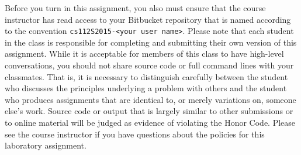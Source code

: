 Before you turn in this assignment, you also must ensure that the course instructor has read access to your Bitbucket
repository that is named according to the convention {\tt cs112S2015-<your user name>}. Please note that each student in
the class is responsible for completing and submitting their own version of this assignment. While it is acceptable for
members of this class to have high-level conversations, you should not share source code or full command lines with your
classmates.  That is, it is necessary to distinguish carefully between the student who discusses the principles
underlying a problem with others and the student who produces assignments that are identical to, or merely variations
on, someone else's work.  Source code or output that is largely similar to other submissions or to online material will
be judged as evidence of violating the Honor Code. Please see the course instructor if you have questions about the policies
for this laboratory assignment.


